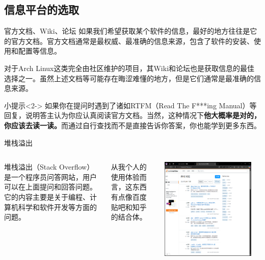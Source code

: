 \documentclass{beamer}
\begin{document}
\subsection{信息平台的选取}

\begin{frame}{官方文档、Wiki、论坛}
    如果我们希望获取某个软件的信息，最好的地方往往是它的官方文档。官方文档通常是最权威、最准确的信息来源，包含了软件的安装、使用和配置等信息。
    
    对于Arch Linux这类完全由社区维护的项目，其Wiki和论坛也是获取信息的最佳选择之一。虽然上述文档等可能存在晦涩难懂的地方，但是它们通常是最准确的信息来源。
    \begin{block}{小提示}<2->
        如果你在提问时遇到了诸如RTFM（Read The F***ing Manual）等回复，说明答主认为你应认真阅读官方文档。当然，这种情况下\textbf{他大概率是对的，你应该去读一读。}而通过自行查找而不是直接告诉你答案，你也能学到更多东西。
    \end{block}
    
\end{frame}

\begin{frame}{堆栈溢出}
    \begin{columns}[T]
        堆栈溢出（Stack Overflow）是一个程序员问答网站，用户可以在上面提问和回答问题。它的内容主要是关于编程、计算机科学和软件开发等方面的问题。

        从我个人的使用体验而言，这东西有点像百度贴吧和知乎的结合体。

        \includegraphics[width=0.9\textwidth]{4-4-StackOverflow.png}
    \end{columns}
\end{frame}
\end{document}
